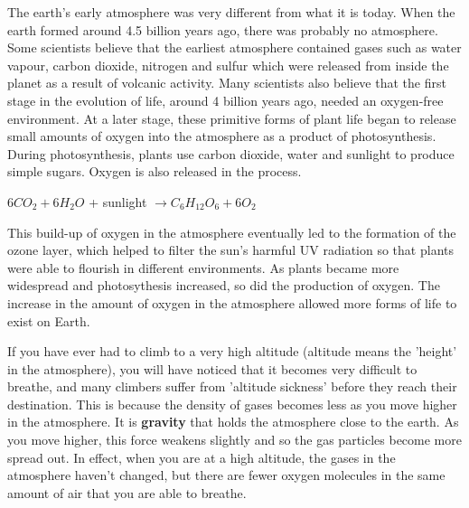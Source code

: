 \begin{IFact}

The earth's early atmosphere was very different from what it is today. When the earth formed around 4.5 billion years ago, there was probably no atmosphere. Some scientists believe that the earliest atmosphere contained gases such as water vapour, carbon dioxide, nitrogen and sulfur which were released from inside the planet as a result of volcanic activity. Many scientists also believe that the first stage in the evolution of life, around 4 billion years ago, needed an oxygen-free environment. At a later stage, these primitive forms of plant life began to release small amounts of oxygen into the atmosphere as a product of photosynthesis. During photosynthesis, plants use carbon dioxide, water and sunlight to produce simple sugars. Oxygen is also released in the process. 

\begin{center}
\rm${6CO_{2} + 6H_{2}O}$ + sunlight \rm${\rightarrow C_{6}H_{12}O_{6} + 6O_{2}}$
\end{center}

This build-up of oxygen in the atmosphere eventually led to the formation of the ozone layer, which helped to filter the sun's harmful UV radiation so that plants were able to flourish in different environments. As plants became more widespread and photosythesis increased, so did the production of oxygen. The increase in the amount of oxygen in the atmosphere allowed more forms of life to exist on Earth.

\end{IFact}

If you have ever had to climb to a very high altitude (altitude means the 'height' in the atmosphere), you will have noticed that it becomes very difficult to breathe, and many climbers suffer from 'altitude sickness' before they reach their destination. This is because the density of gases becomes less as you move higher in the atmosphere. It is \textbf{gravity} that holds the atmosphere close to the earth. As you move higher, this force weakens slightly and so the gas particles become more spread out. In effect, when you are at a high altitude, the gases in the atmosphere haven't changed, but there are fewer oxygen molecules in the same amount of air that you are able to breathe.  


